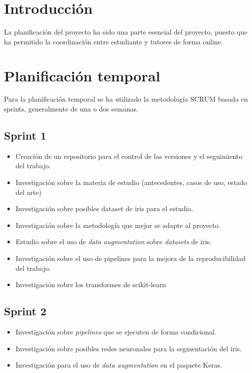 
\section{Introducción}

La planificación del proyecto ha sido una parte esencial del proyecto, puesto que ha permitido la coordinación entre estudiante y tutores de forma online.

\section{Planificación temporal}

Para la planificación temporal se ha utilizado la metodología SCRUM basada en sprints, generalmente de una o dos semanas.

\subsection{Sprint 1}

\begin{itemize}
\item Creación de un repositorio para el control de las versiones y el seguimiento del trabajo.
\item Investigación sobre la materia de estudio (antecedentes, casos de uso, estado del arte)
\item Investigación sobre posibles dataset de iris para el estudio.
\item Investigación sobre la metodología que mejor se adapte al proyecto.
\item Estudio sobre el uso de \textit{data augmentation} sobre \textit{datasets} de iris.
\item Investigación sobre el uso de pipelines para la mejora de la reproducibilidad del trabajo.
\item Investigación sobre los transformes de scikit-learn
\end{itemize}

\subsection{Sprint 2}

\begin{itemize}
\item Investigación sobre \textit{pipelines} que se ejecuten de forma condicional.
\item Investigación sobre posibles redes neuronales para la segmentación del iris.
\item Investigación para el uso de \textit{data augmentation} en el paquete Keras.
\end{itemize}

